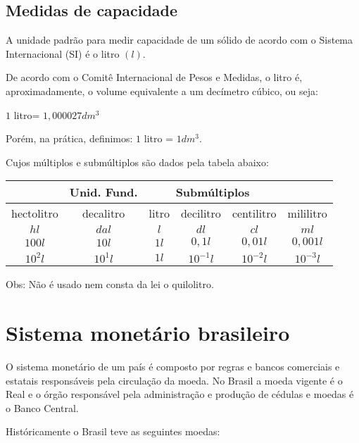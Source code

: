 \subsection{Medidas de capacidade}
A unidade padrão para medir capacidade de um sólido de acordo com o Sistema Internacional (SI) é o litro $(l)$.

De acordo com o Comitê Internacional de Pesos e Medidas, o litro é, aproximadamente, o volume equivalente a um decímetro cúbico, ou seja:

$1$ litro= $1,000027 dm^3$

Porém, na prática, definimos:
$1$ litro = $1 dm^3$.

Cujos múltiplos e submúltiplos são dados pela tabela abaixo:

 \begin{table}[H]
 \centering
 \begin{tabular}{|c|c|c|c|c|c|} \hline
 \rowcolor{cinza}
  \multicolumn{2}{|c|}{\textbf{Múltiplos}} 
 & \multicolumn{1}{|c|}{\textbf{Unid. Fund.}} & \multicolumn{3}{|c|}{\textbf{Submúltiplos}} \\ 
 \hline
 hectolitro & decalitro & litro & decilitro & centilitro & mililitro \\ 
 \hline
 $hl$ & $dal$ & $l$ & $dl$ & $cl$ & $ml$ \\ \hline
 $100 l$ & $10 l$ & $1 l$ & $0,1 l$ & $0,01 l$ & $0,001 l$\\ \hline
 $10^2 l$ & $10^1 l$ & $1 l$ & $10^{-1} l$ & $10^{-2} l$ & $10^{-3} l$\\ \hline
 \end{tabular}
\end{table}

Obs: Não é usado nem consta da lei o quilolitro.



\section{Sistema monetário brasileiro}
O sistema monetário de um país é composto por regras e bancos comerciais e estatais responsáveis pela circulação da moeda. No Brasil a moeda vigente é o Real e o órgão responsável pela administração e produção de cédulas e moedas é o Banco Central.

Históricamente o Brasil teve as seguintes moedas:


